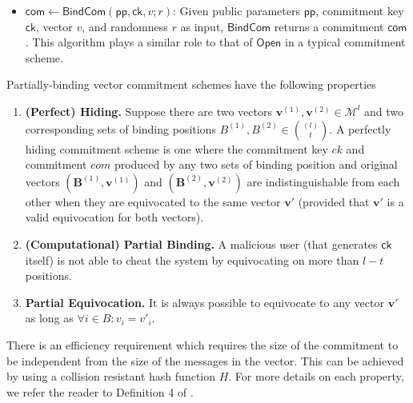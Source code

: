 \begin{definition}
\begin{itemize}
  \item $\mathsf{com} \leftarrow \mathsf{BindCom}(\mathsf{pp}, \mathsf{ck}, v; r)$: Given public parameters 
  $\mathsf{pp}$, commitment key $\mathsf{ck}$, vector $v$, and randomness $r$ as input, $\mathsf{BindCom}$ returns a commitment 
  $\mathsf{com}$. This algorithm plays a similar role to that of $\mathsf{Open}$ in a typical commitment scheme.
  \end{itemize}

  Partially-binding vector commitment schemes have the following properties
  
  \begin{enumerate}
    \item \textbf{(Perfect) Hiding.} Suppose there are two vectors $\mathbf{v}^{(1)}, \mathbf{v}^{(2)} \in \mathcal M^l$ and two corresponding sets of 
    binding positions $B^{(1)}, B^{(2)} \in {(l) \choose t}$. A perfectly hiding commitment scheme is one where the commitment key $ck$ and commitment $com$ 
    produced by any two sets of binding position and original vectors $(\mathbf{B}^{(1)}, \mathbf{v}^{(1)})$ and $(\mathbf{B}^{(2)}, \mathbf{v}^{(2)})$ are 
    indistinguishable from each other when they are equivocated to the same vector $\mathbf{v}'$ (provided that $\mathbf{v}'$ is a valid equivocation for 
    both vectors). 

    \item \textbf{(Computational) Partial Binding.} A malicious user (that generates $\mathsf{ck}$ itself) is not able to cheat the system by equivocating 
    on more than $l - t$ positions.

    \item \textbf{Partial Equivocation.} It is always possible to equivocate to any vector $\mathbf{v}'$ as long as $\forall i \in B: v_i = v'_i$. 
  \end{enumerate}

  There is an efficiency requirement which requires the size of the commitment to be independent from the size of the messages 
  in the vector. This can be achieved by using a collision resistant hash function $H$. 
  For more details on each property, we refer the reader to Definition 4 of \cite{StackingSigmas}. 
\end{definition}


